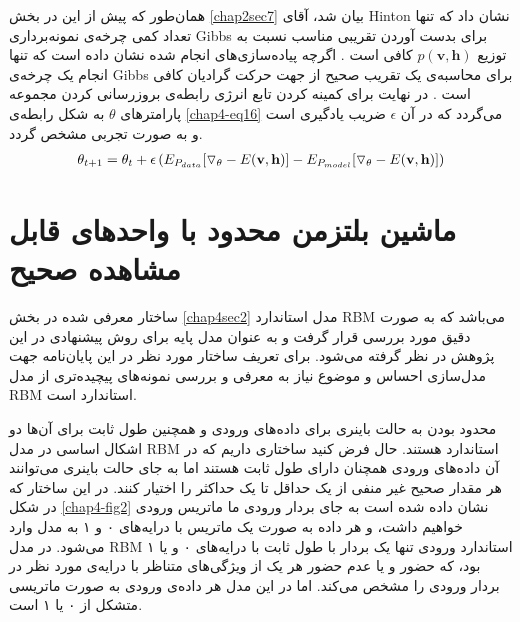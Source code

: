 همان‌طور که پیش از این در بخش
\ref{chap2sec7}
بیان شد، آقای
Hinton
نشان داد که تنها تعداد کمی‌ چرخه‌‌‌ی نمونه‌برداری
Gibbs
برای بدست آوردن تقریبی مناسب نسبت به توزیع
$p(\textbf{v},\textbf{h})$
کافی‌ است
\cite{hinton2002training}\cite{carreira2005contrastive}.
اگرچه پیاده‌سازی‌های انجام شده نشان داده است که تنها انجام یک چرخه‌ی
Gibbs
برای محاسبه‌ی یک تقریب صحیح از جهت حرکت گرادیان کافی‌ است
\cite{carreira2005contrastive}.
در نهایت برای کمینه کردن تابع انرژی رابطه‌ی بروز‌رسانی کردن مجموعه پارامتر‌های 
$\theta$
 به شکل رابطه‌ی
\ref{chap4-eq16}
می‌گردد که در آن
$\epsilon$
ضریب یادگیری است و به صورت تجربی‌ مشخص گردد.
\begin{align}
	\centering
	\label{chap4-eq16}
	\theta_{t+1} = \theta_t + \epsilon \left( E_{P_{data}}[\triangledown_{\theta} -E(\textbf{v},\textbf{h})] - E_{P_{model}}[\triangledown_{\theta} -E(\textbf{v},\textbf{h})] \right) 
\end{align}

\section{ماشین بلتزمن محدود با واحدهای قابل مشاهده صحیح}
\label{chap4sec3}
ساختار معرفی‌ شده در بخش
\ref{chap4sec2}
مدل استاندارد
RBM
می‌باشد که به صورت دقیق مورد بررسی‌ قرار گرفت و به عنوان مدل پایه برای روش پیشنهادی در این پژوهش در نظر گرفته می‌‌شود. برای تعریف ساختار مورد نظر در این پایان‌‌نامه جهت مدل‌سازی احساس و موضوع نیاز به معرفی‌ و بررسی‌ نمونه‌های پیچیده‌تری از مدل
RBM
استاندارد است.

محدود بودن به حالت باینری برای داده‌های ورودی و همچنین طول ثابت برای آن‌ها دو اشکال اساسی در مدل
RBM
استاندارد هستند. حال فرض کنید ساختاری داریم که در آن داده‌های ورودی همچنان دارای طول ثابت هستند اما به جای حالت باینری می‌‌توانند هر مقدار صحیح غیر منفی‌ از یک حداقل تا یک حداکثر را اختیار کنند. در این ساختار که در شکل
\ref{chap4-fig2}
نشان داده شده است به جای بردار ورودی ما ماتریس ورودی خواهیم داشت، و هر داده به صورت یک ماتریس با درایه‌های ۰ و ۱ به مدل وارد می‌‌شود. در مدل
RBM
استاندارد ورودی تنها یک بردار با طول ثابت با درایه‌های ۰ و یا ۱ بود، که حضور و یا عدم حضور هر یک از ویژگی‌‌های متناظر با درایه‌ی مورد نظر در بردار ورودی را مشخص می‌‌کند. اما در این مدل هر داده‌ی ورودی به صورت ماتریسی متشکل از ۰ یا ۱ است.

